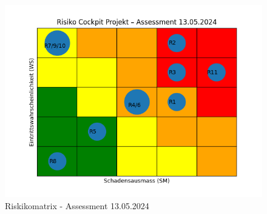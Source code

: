 \recalctypearea
\begin{flushleft}
    \begin{figure}[H]
        \centering
        \includegraphics[width=0.75\linewidth]{source/riskmatrix/project-assessment-13-05-2024}
        \caption{Riskikomatrix - Assessment 13.05.2024}
        \label{fig:project-assessment-13-05-2024}
    \end{figure}
\end{flushleft}
